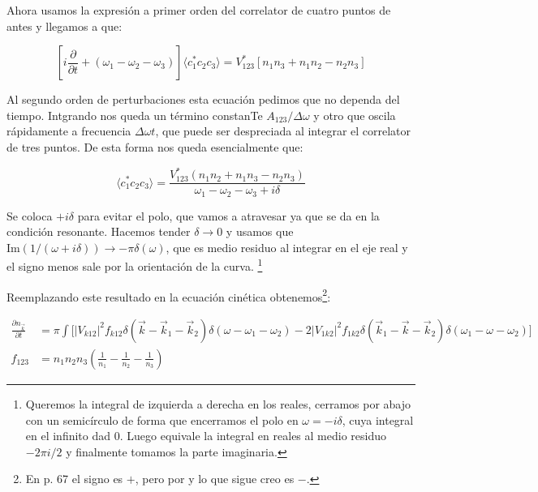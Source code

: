 Ahora usamos la expresión a primer orden del correlator de cuatro puntos de antes y llegamos a que:

\begin{equation}
	\left[i\frac{\partial}{\partial t} + (\omega_1-\omega_2-\omega_3)\right] \langle c_1^*c_2c_3 \rangle = V_{123}^*[n_1n_3+n_1n_2-n_2n_3]
\end{equation}

Al segundo orden de perturbaciones esta ecuación pedimos que no dependa del tiempo. Intgrando nos queda un término constanTe $A_{123}/\Delta\omega$ y otro que oscila rápidamente a frecuencia $\Delta\omega t$, que puede ser despreciada al integrar el correlator de tres puntos. De esta forma nos queda esencialmente que:

\begin{equation}
	\langle c_1^*c_2c_3 \rangle = \frac{V_{123}^*(n_1n_2+n_1n_3-n_2n_3)}{\omega_1-\omega_2-\omega_3+i\delta}
\end{equation} 

Se coloca $+i\delta$ para evitar el polo, que vamos a atravesar ya que se da en la condición resonante. Hacemos tender $\delta\rightarrow0$ y usamos que $\text{Im}(1/(\omega+i\delta))\rightarrow-\pi\delta(\omega)$, que es medio residuo al integrar en el eje real y el signo menos sale por la orientación de la curva. \footnote{Queremos la integral de izquierda a derecha en los reales, cerramos por abajo con un semicírculo de forma que encerramos el polo en $\omega=-i\delta$, cuya integral en el infinito dad 0. Luego equivale la integral en reales al medio residuo $-2\pi i/2$ y finalmente tomamos la parte imaginaria.} 


Reemplazando este resultado en la ecuación cinética obtenemos\footnote{En \cite{zakharovKolmogorovSpectraTurbulence1992} p. 67 el signo es $+$, pero por \cite{nazarenkoWaveTurbulence2011} y lo que sigue creo es $-$.}:

\begin{equation}
	\begin{split}
		\frac{\partial n_{\vec k}}{\partial t} &= \pi \int\big[|V_{k12}|^2f_{k12}\delta(\vec k - \vec k_1 - \vec k_2) \delta(\omega - \omega_1 - \omega_2) - 2 |V_{1k2}|^2 f_{1k2} \delta(\vec k_1 - \vec k - \vec k_2) \delta(\omega_1 - \omega - \omega_2) \big]  \\ 
		f_{123} &= n_1n_2n_3\left(\frac{1}{n_1} - \frac{1}{n_2} -  \frac{1}{n_3}\right)
	\end{split}
\end{equation}



